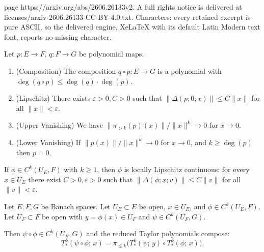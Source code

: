 \documentclass[10pt,a4paper]{amsart}
\newcommand{\eps}{\varepsilon} %
\newcommand{\ra}{\rightarrow} %
\newcommand{\tightlist}{\setlength{\itemsep}{0pt}\setlength{\parskip}{0pt}}
\begin{document}
page https://arxiv.org/abs/2606.26133v2. A full rights notice is delivered at licenses/arxiv-2606.26133-CC-BY-4.0.txt. Characters: every retained excerpt is pure ASCII, so the delivered engine, XeLaTeX with its default Latin Modern text font, reports no missing character.
\begin{lemma}

\label{lem:poly-props} Let \(p : E \ra F\), \(q: F \ra G\) be polynomial
maps.

\begin{enumerate}
\def\labelenumi{\arabic{enumi}.}
\tightlist
\item
  (Composition) The composition \(q \circ p: E \ra G\) is a polynomial
  with \(\deg(q \circ p) \leq \deg(q) \cdot \deg(p)\).
\item
  (Lipschitz) There exists \(\eps > 0, C>0\) such that
  \(\|\Delta(p; 0; x)\| \le C \|x\|\) for all \(\|x\| < \eps\).
\item
  (Upper Vanishing) We have \(\| \pi_{> k}(p)(x)\| / \|x\|^{k} \ra 0\)
  for \(x \ra 0\).
\item
  (Lower Vanishing) If \(\|p(x)\| / \|x\|^{k} \ra 0\) for \(x \ra 0\),
  and \(k \geq \deg(p)\) then \(p = 0\).
\end{enumerate}

\end{lemma}

\begin{lemma}

\label{lem:lipschitz} If \(\phi \in C^k(U_E, F)\) with \(k \geq 1\),
then \(\phi\) is locally Lipschitz continuous: for every \(x \in U_E\)
there exist \(C > 0, \eps > 0\) such that
\(\| \Delta(\phi; x; v) \| \leq C \|v\|\) for all \(\|v\| < \eps\).

\end{lemma}

\begin{theorem}

\label{thm:fdb-comp} Let \(E,F,G\) be Banach spaces. Let
\(U_E \subset E\) be open, \(x \in U_E\), and \(\phi \in C^k(U_E, F)\).
Let \(U_F \subset F\) be open with \(y = \phi(x) \in U_F\) and
\(\psi \in C^k(U_F, G)\).

Then \(\psi \circ \phi \in C^k(U_E, G)\) and the reduced Taylor
polynomials compose: \[
    T_{\ast}^k(\psi \circ \phi;\, x) = \pi_{\leq k}\bigl( T_{\ast}^k(\psi;\, y) \circ T_{\ast}^k(\phi;\, x) \bigr).
    \]

\end{theorem}
\end{document}
